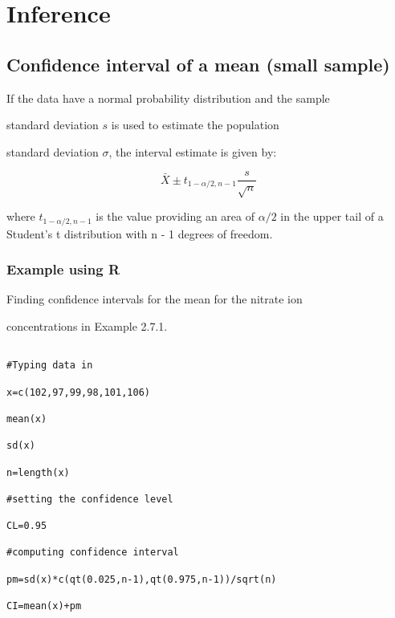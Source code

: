  


 

\section{Inference}

 

\subsection{Confidence interval of a mean (small sample)}

 

If the data have a normal probability distribution and the sample

standard deviation $s$ is used to estimate the population

standard deviation $\sigma$, the interval estimate is given by:

\begin{equation}

\bar{X} \pm t_{1-\alpha/2,n-1}\frac{s}{\sqrt{n}}

\end{equation}

where $t_{1-\alpha/2,n-1}$ is the value providing an area of $\alpha/2$ in the upper tail of a Student’s t distribution with n - 1 degrees of freedom.

 

\subsubsection{Example using R}

Finding confidence intervals for the mean for the nitrate ion

concentrations in Example 2.7.1.

\begin{verbatim}

#Typing data in

x=c(102,97,99,98,101,106)

mean(x)

sd(x)

n=length(x)

#setting the confidence level

CL=0.95

#computing confidence interval

pm=sd(x)*c(qt(0.025,n-1),qt(0.975,n-1))/sqrt(n)

CI=mean(x)+pm

\end{verbatim}


